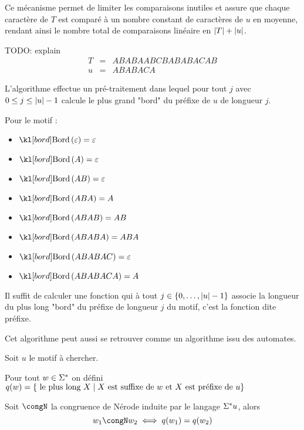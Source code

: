 Ce mécanisme permet de limiter les comparaisons inutiles et assure que chaque caractère de $T$
est comparé à un nombre constant de caractères de $u$ en moyenne, rendant ainsi le nombre total
de comparaisons linéaire en $|T| + |u|$.


\begin{exemple}
	TODO: explain
	\begin{eqnarray*}
		T &=& ABABAABCBABABACAB \\
		u &=& ABABACA
	\end{eqnarray*}
\end{exemple}


L'algorithme effectue un pré-traitement dans lequel pour tout $j$ avec $0 \leq j \leq |u| - 1$
calcule le plus grand "bord" du préfixe de $u$ de longueur $j$.

\begin{exemple}
	Pour le motif :

	\begin{itemize}
		\item $\Bord {\motvide} = \motvide$
		\item $\Bord A = \motvide$
		\item $\Bord {AB} = \motvide$
		\item $\Bord {ABA} = A$
		\item $\Bord {ABAB} = AB$
		\item $\Bord {ABABA} = ABA$
		\item $\Bord {ABABAC} = \motvide$
		\item $\Bord {ABABACA} = A$
	\end{itemize}
\end{exemple}

Il suffit de calculer une fonction qui à tout $j \in \left\{0,\ldots,|u| - 1\right\}$ associe
la longueur du plus long "bord" du préfixe de longueur $j$ du motif, c'est la fonction dite préfixe.


Cet algorithme peut aussi se retrouver comme un algorithme issu des automates.

Soit $u$ le motif à chercher.

\begin{definition}
	Pour tout $w \in \Sigma^{*}$ on défini
	$q(w) = \left\{\text{ le plus long } X \mid X \text{ est suffixe de } w \text{ et } X \text{ est préfixe de } u\right\}$
\end{definition}

\begin{prop}
	Soit $\congN$ la congruence de Nérode induite par le langage $\Sigma^{*} u$, alors
	$$ w_1 \congN w_2 \iff q(w_1) = q(w_2)$$
\end{prop}


